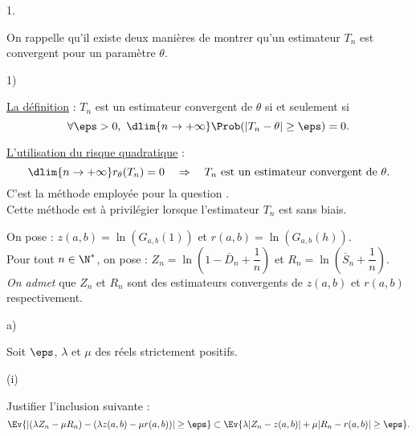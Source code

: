 \documentclass[11pt]{article}%
\begin{document}
\begin{noliste}{1.}
  \newpage
  
  
  
  \begin{remark}%
    On rappelle qu'il existe deux manières de montrer qu'un estimateur 
    $T_n$ est convergent pour un paramètre $\theta$.
    \begin{noliste}{1)}
    \item \underline{La définition} : $T_n$ est un estimateur convergent 
    de $\theta$ si et seulement si
    \[
    \forall \eps>0, \ \dlim{n\to+\infty} \Prob(\vert 
    T_n-\theta\vert \geq \eps)=0.
    \]
    \item \underline{L'utilisation du risque quadratique} : 
    \[
    \dlim{n\to+\infty} r_\theta(T_n)=0 \quad \Rightarrow \quad
    \mbox{$T_n$ est un estimateur convergent de $\theta$.}
    \]
    C'est la méthode employée pour la question .\\
    Cette méthode est à privilégier lorsque l'estimateur $T_n$ est sans 
    biais.
    \end{noliste}
    \end{remark}


\item On pose : $z(a,b)=\ln(G_{a,b}(1))$ et $r(a,b)=\ln(G_{a,b}(h))$.\\
  Pour tout $n\in\N^*$, on pose : $Z_n = \ln\left(1-\overline{D}_n
    +\dfrac{1}{n}\right)$ et $R_n =
  \ln\left(\overline{S}_n+\dfrac{1}{n}\right)$.\\
  {\it On admet} que $Z_n$ et $R_n$ sont des estimateurs convergents
  de $z(a,b)$ et $r(a,b)$ respectivement.
  \begin{noliste}{a)}
    \setlength{\itemsep}{2mm}
  \item Soit $\eps$, $\lambda$ et $\mu$ des réels strictement
    positifs.
    \begin{noliste}{(i)}
    \item Justifier l'inclusion suivante :
      \[
      \Ev{ \left\vert (\lambda Z_n-\mu R_n) - (\lambda z(a,b) -\mu
          r(a,b))\right\vert \geq \eps} \subset \Ev{\lambda
        \vert Z_n - z(a,b)\vert + \mu \vert R_n-r(a,b)\vert \geq
        \eps}.
      \]
      

\end{noliste}
\end{noliste}
\end{noliste}
\end{document}
